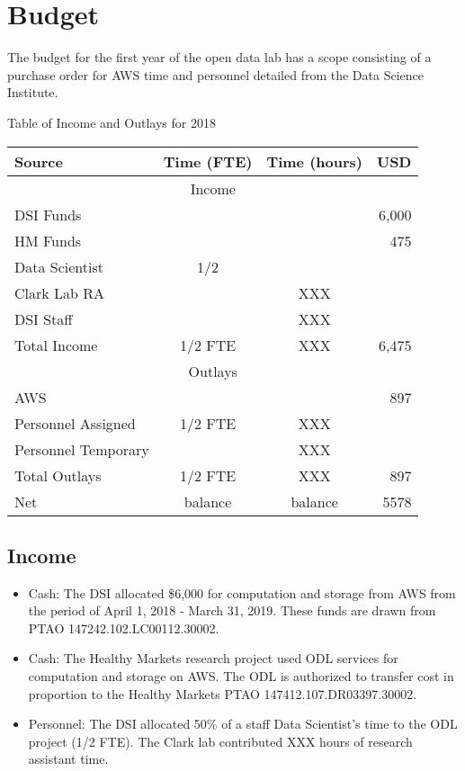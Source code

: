 \section{Budget} %
The budget for the first year of the open data lab has a scope consisting of a purchase order for AWS time and personnel detailed from the Data Science Institute.

\begin{center}
Table of Income and Outlays for 2018

\begin{tabular}{lccr}
\hline
\hline
Source & Time (FTE) & Time (hours) & USD \\
\hline
\multicolumn{4}{c}{Income} \\
\hline
DSI Funds & && 6,000 \\
HM Funds & && 475 \\
Data Scientist & 1/2 & & \\
Clark Lab RA & &XXX & \\
DSI Staff & &XXX & \\
\hline
Total Income & 1/2 FTE & XXX & 6,475 \\
\hline
\hline
\multicolumn{4}{c}{Outlays} \\
\hline
AWS & && 897 \\
Personnel Assigned & 1/2 FTE & XXX & \\
Personnel Temporary & & XXX & \\
\hline
Total Outlays & 1/2 FTE & XXX & 897 \\
\hline
\hline
Net & balance & balance & 5578 \\
\hline
\hline
\end{tabular}
\end{center}

\subsection{Income}
\begin{itemize}
\item Cash: The DSI allocated \$6,000 for computation and storage from AWS from the period of April 1, 2018 - March 31, 2019. These funds are drawn from PTAO 147242.102.LC00112.30002.
\item Cash: The Healthy Markets research project used ODL services for computation and storage on AWS. The ODL is authorized to transfer cost in proportion to the Healthy Markets PTAO 147412.107.DR03397.30002.
\item Personnel: The DSI allocated 50\% of a staff Data Scientist's time to the ODL project (1/2 FTE). The Clark lab contributed XXX hours of research assistant time.
\end{itemize}
